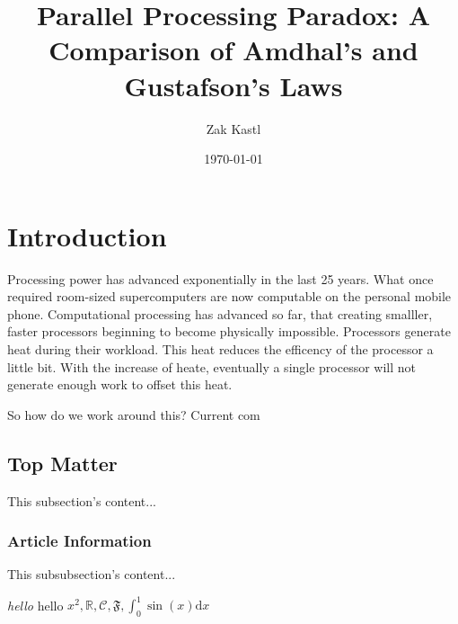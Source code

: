 \documentclass{article}
\begin{document}
\title{Parallel Processing Paradox: A Comparison of Amdhal's and Gustafson's Laws}
\author{Zak Kastl}
\date{\today}
\maketitle

\section{Introduction}
Processing power has advanced exponentially in the last 25 years. What once required room-sized supercomputers are now computable on the personal mobile phone. Computational processing has advanced so far, that creating smalller, faster processors beginning to become physically impossible. Processors generate heat during their workload. This heat reduces the efficency of the processor a little bit. With the increase of heate, eventually a single processor will not generate enough work to offset this heat. 

So how do we work around this? Current com

\subsection{Top Matter}
This subsection's content...

\subsubsection{Article Information}
This subsubsection's content...

\emph{hello} hello $x^2, \mathbb R, \mathcal C, \mathfrak F, \int_0^1 \sin(x) \mathrm d x$
\end{document}
